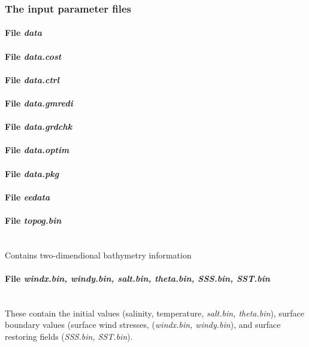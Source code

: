 \subsubsection{The input parameter files}

\paragraph{File {\it data}}

\paragraph{File {\it data.cost}}

\paragraph{File {\it data.ctrl}}

\paragraph{File {\it data.gmredi}}

\paragraph{File {\it data.grdchk}}

\paragraph{File {\it data.optim}}

\paragraph{File {\it data.pkg}}

\paragraph{File {\it eedata}}

\paragraph{File {\it topog.bin}} ~ \\
%
Contains two-dimendional bathymetry information

\paragraph{File {\it windx.bin, windy.bin, salt.bin, theta.bin, 
SSS.bin, SST.bin}} ~ \\
%
These contain the initial values
(salinity, temperature, {\it salt.bin, theta.bin}), 
surface boundary values (surface wind stresses,
({\it windx.bin, windy.bin}), and surface restoring fields
({\it SSS.bin, SST.bin}).

